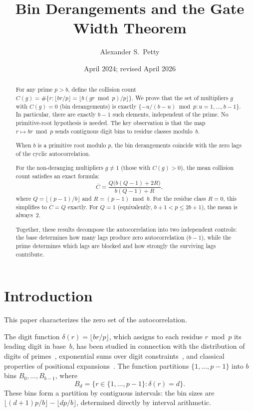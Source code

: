 \documentclass[12pt]{amsart}
\title{Bin Derangements and the Gate Width Theorem}
\author{Alexander S.\ Petty}
\date{April 2024; revised April 2026}
\theoremstyle{definition}
\theoremstyle{remark}
\begin{document}
\begin{abstract}
For any prime $p > b$, define the collision count
$C(g) = \#\{r : \lfloor br/p \rfloor =
\lfloor b(gr \bmod p)/p \rfloor\}$. We prove that
the set of multipliers $g$ with $C(g) = 0$
(bin derangements) is exactly
$\{-u/(b{-}u) \bmod p : u = 1, \ldots, b{-}1\}$.
In particular, there are exactly $b - 1$ such elements,
independent of the prime. No primitive-root hypothesis
is needed. The key observation is that the map
$r \mapsto br \bmod p$ sends contiguous digit bins to
residue classes modulo~$b$.

When $b$ is a primitive root modulo $p$, the bin
derangements coincide with the zero lags of the
cyclic autocorrelation.

For the non-deranging multipliers $g \ne 1$
(those with $C(g) > 0$), the mean collision count satisfies an
exact formula:
\[
\overline{C} = \frac{Q\bigl(b(Q{-}1) + 2R\bigr)}{b(Q{-}1) + R},
\]
where $Q = \lfloor (p{-}1)/b \rfloor$ and $R = (p{-}1) \bmod b$.
For the residue class $R = 0$, this simplifies to
$\overline{C}=Q$ exactly. For $Q = 1$ (equivalently,
$b+1 < p \le 2b+1$), the mean is always~$2$.

Together, these results decompose the autocorrelation into two
independent controls: the base determines how many lags produce
zero autocorrelation ($b - 1$), while the prime determines which
lags are blocked and how strongly the surviving lags contribute.
\end{abstract}
\maketitle

\section{Introduction}

This paper characterizes the zero set of the autocorrelation.

The digit function $\delta(r) = \lfloor br/p \rfloor$, which
assigns to each residue $r \bmod p$ its leading digit in
base~$b$, has been studied in connection with the distribution
of digits of primes~\cite{mauduit-rivat}, exponential sums
over digit constraints~\cite{shparlinski}, and classical
properties of positional expansions~\cite{hardy-wright}. The
function partitions $\{1, \ldots, p{-}1\}$ into $b$ bins
$B_0, \ldots, B_{b-1}$, where
\[
B_d = \{r \in \{1, \ldots, p{-}1\} : \delta(r) = d\}.
\]
These bins form a partition by contiguous intervals: the bin sizes are
$\lfloor (d{+}1)p/b \rfloor - \lfloor dp/b \rfloor$,
determined directly by interval arithmetic.
\end{document}
